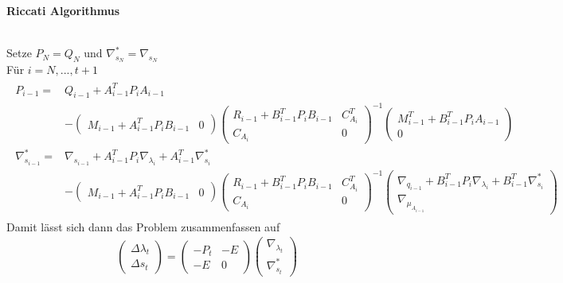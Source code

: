 \documentclass[12pt,a4paper]{article}
\begin{document}
  \begin{large}
  \textbf{Riccati Algorithmus}
  \end{large} \\
  Setze $P_N = Q_N$ und $ \nabla_{s_N}^{*} = \nabla_{s_N} $ \\
  Für $i = N,..., t+1 $
  \begin{align*}
  \begin{array}{rl}
  P_{i-1} = & Q_{i-1}+A_{i-1}^{T}P_i A_{i-1} \\
   & - \begin{pmatrix}
   M_{i-1} + A_{i-1}^{T}P_i B_{i-1} & 0
\end{pmatrix}    
  \begin{pmatrix}
  R_{i-1}+B_{i-1}^{T}P_i B_{i-1} & C_{A_i}^T \\
  C_{A_i} & 0
  \end{pmatrix} ^{-1}
  \begin{pmatrix}
  M_{i-1}^T + B_{i-1}^{T}P_i A_{i-1} \\
  0
  \end{pmatrix}
    \\
  \nabla_{s_{i-1}}^{*} = & \nabla_{s_{i-1}} + A_{i-1}^{T}P_i \nabla_{\lambda_{i}} + A_{i-1}^{T}\nabla_{s_{i}}^{*} \\
   & - \begin{pmatrix}
   M_{i-1} + A_{i-1}^{T}P_i B_{i-1} & 0
\end{pmatrix}  
\begin{pmatrix}
R_{i-1}+B_{i-1}^{T}P_i B_{i-1} & C_{A_i}^T \\
C_{A_i} & 0
\end{pmatrix} ^{-1}
\begin{pmatrix}
\nabla_{q_{i-1}} +B_{i-1}^{T}P_i \nabla_{\lambda_{i}} +B_{i-1}^{T}\nabla_{s_{i}}^{*} \\
\nabla_{\mu_{A_{i-1}}}
\end{pmatrix}
  \end{array}
  \end{align*}
  Damit lässt sich dann das Problem zusammenfassen auf
  \begin{align*}
  \begin{pmatrix}
  \Delta \lambda_{t} \\
  \Delta s_{t}
  \end{pmatrix} =
  \begin{pmatrix}
  -P_t & -E \\
  -E  & 0 
  \end{pmatrix}
  \begin{pmatrix}
  \nabla_{\lambda_{t}} \\
  \nabla_{s_{t}}^{*}
  \end{pmatrix}
  \end{align*}
\end{document}
